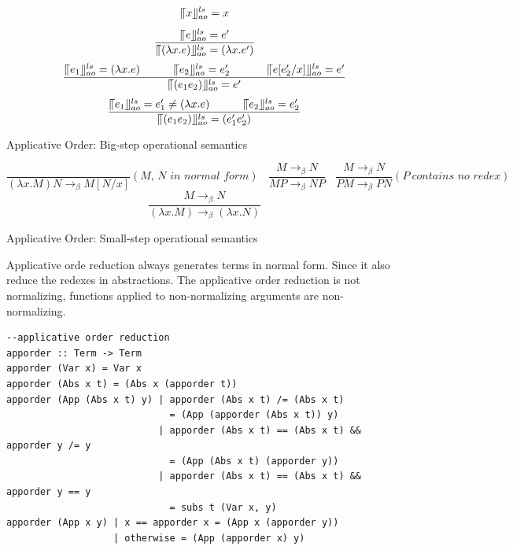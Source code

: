 \begin{equation*}
\llceil x \rrfloor ^{ls} _{ao} = x
\end{equation*}
\begin{equation*}
\frac{\llceil e \rrfloor ^{ls} _{ao} = e'}{\llceil (\lambda x.e) \rrfloor ^{ls} _{ao} = (\lambda x.e')}
\end{equation*}
\begin{equation*}
\frac{\llceil e_1 \rrfloor ^{ls} _{ao} = (\lambda x.e)\ \ \ \ \ \ \ \ \ \llceil e_2 \rrfloor ^{ls} _{ao} = e'_2\ \ \ \ \ \ \ \ \ \ \llceil e[e'_2/x] \rrfloor ^{ls} _{ao} = e'}{\llceil (e_1e_2) \rrfloor ^{ls} _{ao} = e'}
\end{equation*}
\begin{equation*}
\frac{\llceil e_1 \rrfloor ^{ls} _{ao} = e'_1\neq (\lambda x.e)\ \ \ \ \ \ \ \ \ \llceil e_2 \rrfloor ^{ls} _{ao} = e'_2}{\llceil (e_1e_2) \rrfloor ^{ls} _{ao} = (e'_1e'_2)}
\end{equation*}
\begin{center}
Applicative Order: Big-step operational semantics
\end{center}

\begin{equation*}
\frac{}{(\lambda x.M)N \rightarrow _\beta M[N/x]}(\textit{M, N in normal form})\ \ \ \ 
\frac{M \rightarrow _\beta N}{MP \rightarrow _\beta NP}\ \ \ \ 
\frac{M \rightarrow _\beta N}{PM \rightarrow _\beta PN}(P\ \textit{contains no redex})\ \ \ \ 
\end{equation*}
\begin{equation*}
\frac{M \rightarrow _\beta N}{(\lambda x.M) \rightarrow _\beta (\lambda x.N)}
\end{equation*}
\begin{center}
Applicative Order: Small-step operational semantics
\end{center}

Applicative orde reduction always generates terms in normal form. Since it also reduce the redexes in abstractions. The applicative order reduction is not normalizing, functions applied to non-normalizing arguments are non-normalizing.



\begin{verbatim}
--applicative order reduction
apporder :: Term -> Term
apporder (Var x) = Var x
apporder (Abs x t) = (Abs x (apporder t))
apporder (App (Abs x t) y) | apporder (Abs x t) /= (Abs x t)  
                             = (App (apporder (Abs x t)) y)
                           | apporder (Abs x t) == (Abs x t) && apporder y /= y 
                             = (App (Abs x t) (apporder y))
                           | apporder (Abs x t) == (Abs x t) && apporder y == y 
                             = subs t (Var x, y)          
apporder (App x y) | x == apporder x = (App x (apporder y))
                   | otherwise = (App (apporder x) y)  
\end{verbatim}

